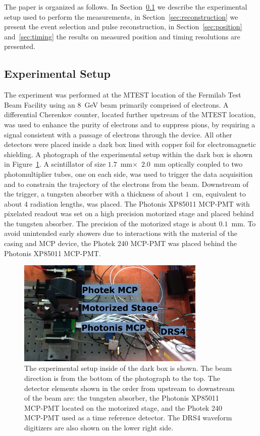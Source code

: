 The paper is organized as follows. In Section~\ref{sec:setup} we describe the
experimental setup used to perform the measurements, in
Section~\ref{sec:reconstruction} we present the event selection and pulse
reconstruction, in Section~\ref{sec:position} and~\ref{sec:timing} the results
on measured position and timing resolutions are presented. 

\subsection{Experimental Setup} \label{sec:setup} The experiment was performed at
the MTEST location of the Fermilab Test Beam Facility using an $8$~GeV beam
primarily comprised of electrons. A differential Cherenkov counter, located
further upstream of the MTEST location, was used to enhance the purity of
electrons and to suppress pions, by requiring a signal consistent with a passage
of electrons through the device. All other detectors were placed inside a dark
box lined with copper foil for electromagnetic shielding. A photograph of the
experimental setup within the dark box is shown in Figure~\ref{fig:setup}. A
scintillator of size $1.7$~mm$\times$~$2.0$~mm optically coupled to two
photomultiplier tubes, one on each side, was used to trigger the data
acquisition and to constrain the trajectory of the electrons from the beam.
Downstream of the trigger, a tungsten absorber with a thickness of about $1$~cm,
equivalent to about 4 radiation lengths, was placed. The Photonis XP85011
MCP-PMT with pixelated readout was set on a high precision motorized stage and
placed behind the tungsten absorber. The precision of the motorized stage is
about $0.1$~mm. To avoid unintended early showers due to interactions with the
material of the casing and MCP device, the Photek 240 MCP-PMT was placed behind
the Photonis XP85011 MCP-PMT. 

\begin{figure}[htbp] 
\centering
\includegraphics[width=0.8\textwidth]{Images/setup/setup.png} 
\caption{The experimental setup inside of the dark box is shown. The beam direction is from
the bottom of the photograph to the top. The detector elements shown in the
order from upstream to downstream of the beam are: the tungsten absorber, the
Photonis XP85011 MCP-PMT located on the motorized stage, and the Photek 240
MCP-PMT used as a time reference detector. The DRS4 waveform digitizers are also
shown on the lower right side.} 
\label{fig:setup} 
\end{figure} 

